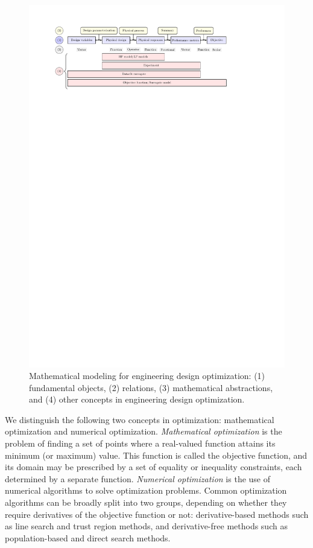 \documentclass[iicol,sn-basic]{sn-jnl}%
\begin{document}
\begin{figure}
	\centering
	\includegraphics[scale=0.75]{Fig1.pdf}
	\caption{Mathematical modeling for engineering design optimization: (1) fundamental objects, (2) relations, (3) mathematical abstractions, and (4) other concepts in engineering design optimization.}
	\label{Fig-1}
\end{figure}

We distinguish the following two concepts in optimization: mathematical optimization and numerical optimization.
\textit{Mathematical optimization} is the problem of finding a set of points where a real-valued function attains its minimum (or maximum) value.
This function is called the objective function, and its domain may be prescribed by a set of equality or inequality constraints, each determined by a separate function.
\textit{Numerical optimization} is the use of numerical algorithms to solve optimization problems.
Common optimization algorithms can be broadly split into two groups, depending on whether they require derivatives of the objective function or not: derivative-based methods such as line search and trust region methods, and derivative-free methods such as population-based and direct search methods.
\end{document}
